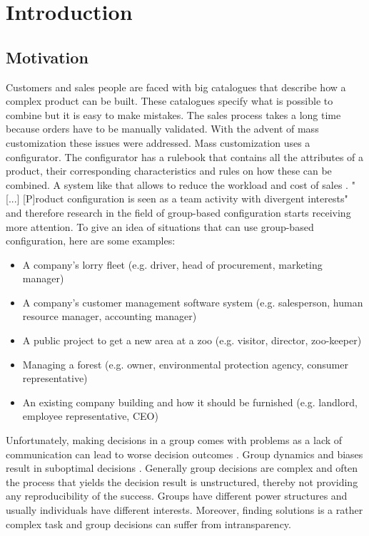 \chapter{Introduction}
\label{ch:Introduction}

\section{Motivation}
\label{sec:Introduction:Goals}

Customers and sales people are faced with big catalogues that describe how a complex product can be built. These catalogues specify what is possible to combine but it is easy to make mistakes. The sales process takes a long time because orders have to be manually validated. With the advent of mass customization these issues were addressed. Mass customization uses a configurator. The configurator has a rulebook that contains all the attributes of a product, their corresponding characteristics and rules on how these can be combined. A system like that allows to reduce the workload and cost of sales \cite{shafieeCostBenefitAnalysis2018}. "[...] [P]roduct configuration is seen as a team activity with divergent interests" \cite{mendoncaCollaborativeProductConfiguration2008} and therefore research in the field of group-based configuration starts receiving more attention. 
To give an idea of situations that can use group-based configuration, here are some examples:
\begin{itemize}
    \item A company's lorry fleet (e.g. driver, head of procurement, marketing manager)
    \item A company's customer management software system (e.g. salesperson, human resource manager, accounting manager)
    \item A public project to get a new area at a zoo (e.g. visitor, director, zoo-keeper)
    \item Managing a forest (e.g. owner, environmental protection agency, consumer representative)
    \item An existing company building and how it should be furnished (e.g. landlord, employee representative, CEO)
\end{itemize}

Unfortunately, making decisions in a group comes with problems as a lack of communication can lead to worse decision outcomes \cite{atasItemRecommendationUsing2017}. Group dynamics and biases result in suboptimal decisions \cite{kerrBiasJudgmentComparing1996}.
Generally group decisions are complex and often the process that yields the decision result is unstructured, thereby not providing any reproducibility of the success. Groups have different power structures and usually individuals have different interests. Moreover, finding solutions is a rather complex task and group decisions can suffer from intransparency.

